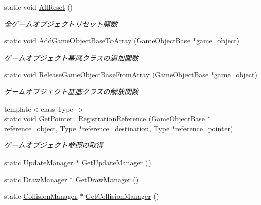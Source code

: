 \begin{DoxyCompactItemize}
static void \mbox{\hyperlink{class_game_object_manager_a38f980aec0970f45eb9bc55db8ac01a3}{All\+Reset}} ()
\begin{DoxyCompactList}\small\item\em 全ゲームオブジェクトリセット関数 \end{DoxyCompactList}\item 
static void \mbox{\hyperlink{class_game_object_manager_ab42e8ca2c7e586d05d513e8a868a86ef}{Add\+Game\+Object\+Base\+To\+Array}} (\mbox{\hyperlink{class_game_object_base}{Game\+Object\+Base}} $\ast$game\+\_\+object)
\begin{DoxyCompactList}\small\item\em ゲームオブジェクト基底クラスの追加関数 \end{DoxyCompactList}\item 
static void \mbox{\hyperlink{class_game_object_manager_a83342c1c358e32f6478ae3428fcb25fa}{Release\+Game\+Object\+Base\+From\+Array}} (\mbox{\hyperlink{class_game_object_base}{Game\+Object\+Base}} $\ast$game\+\_\+object)
\begin{DoxyCompactList}\small\item\em ゲームオブジェクト基底クラスの解放関数 \end{DoxyCompactList}\item 
{\footnotesize template$<$class Type $>$ }\\static void \mbox{\hyperlink{class_game_object_manager_a4b905d160c31b234686a3d46c0743adb}{Get\+Pointer\+\_\+\+Registration\+Reference}} (\mbox{\hyperlink{class_game_object_base}{Game\+Object\+Base}} $\ast$reference\+\_\+object, Type $\ast$reference\+\_\+destination, Type $\ast$reference\+\_\+pointer)
\begin{DoxyCompactList}\small\item\em ゲームオブジェクト参照の取得 \end{DoxyCompactList}\item 
static \mbox{\hyperlink{class_update_manager}{Update\+Manager}} $\ast$ \mbox{\hyperlink{class_game_object_manager_a7d34b53f99cc2264ab6a8c253392a865}{Get\+Update\+Manager}} ()
\item 
static \mbox{\hyperlink{class_draw_manager}{Draw\+Manager}} $\ast$ \mbox{\hyperlink{class_game_object_manager_a862e76bfd74495c20bddd377c62a22b7}{Get\+Draw\+Manager}} ()
\item 
static \mbox{\hyperlink{class_collision_manager}{Collision\+Manager}} $\ast$ \mbox{\hyperlink{class_game_object_manager_a41775a8308691a84b468a0aeeb1b3376}{Get\+Collision\+Manager}} ()
\end{DoxyCompactItemize}
